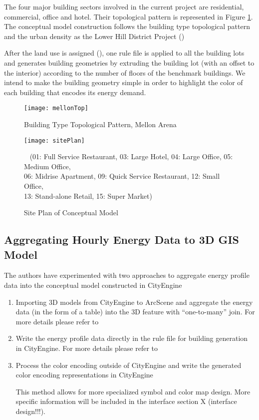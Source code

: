 The four major building sectors involved in the current project are
residential, commercial, office and hotel. Their topological pattern
is represented in Figure \ref{fig:mellonTop}. The conceptual model
construction follows the building type topological pattern and the
urban density as the Lower Hill District Project ()

After the land use is assigned (), one rule file is
applied to all the building lots and generates building geometries by
extruding the building lot (with an offset to the interior) according
to the number of floors of the benchmark buildings. We intend to make
the building geometry simple in order to highlight the color of each
building that encodes its energy demand.

\begin{figure}[h!]
  \centering
  \texttt{[image: mellonTop]}
  \caption[Building Type Topology]{Building Type Topological Pattern, Mellon Arena}
  \label{fig:mellonTop}
\end{figure}

\begin{figure}[h!]
  \centering
  \texttt{[image: sitePlan]}
  \caption[Conceptual Model Site Plan]{Site Plan of Conceptual Model}~ (01: Full Service
  Restaurant, 03: Large Hotel, 04: Large Office, 05: Medium Office,
  \\06: Midrise Apartment, 09: Quick Service Restaurant, 12: Small
  Office, \\13: Stand-alone Retail, 15: Super Market)
  \label{fig:sitePlan}
\end{figure}

\subsection{Aggregating Hourly Energy Data to 3D GIS Model}\label{sec:aggregateTime}
The authors have experimented with two approaches to aggregate energy
profile data into the conceptual model constructed in CityEngine
\begin{enumerate}[1)]
\item Importing 3D models from CityEngine to ArcScene and aggregate
  the energy data (in the form of a table) into the 3D feature with
  ``one-to-many'' join. For more details please refer to

\item Write the energy profile data directly in the rule file for
  building generation in CityEngine. For more details please refer to

\item Process the color encoding outside of CityEngine and write the
  generated color encoding representations in CityEngine

  This method allows for more specialized symbol and color map
  design. More specific information will be included in the interface
  section X (interface design!!!).

\end{enumerate}

